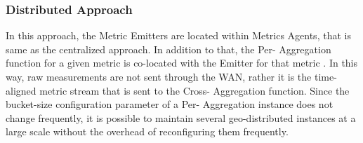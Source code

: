 \subsubsection{Distributed Approach}
In this approach, the Metric Emitters are located within Metrics Agents, that is same as the centralized approach. In addition to that, the Per- Aggregation function for a given metric  is co-located with the Emitter for that metric . In this way, raw measurements are not sent through the WAN, rather it is the time-aligned metric stream that is sent to the Cross- Aggregation function. Since the bucket-size configuration parameter of a Per- Aggregation instance does not change frequently, it is possible to maintain several geo-distributed instances at a large scale without the overhead of reconfiguring them frequently.

